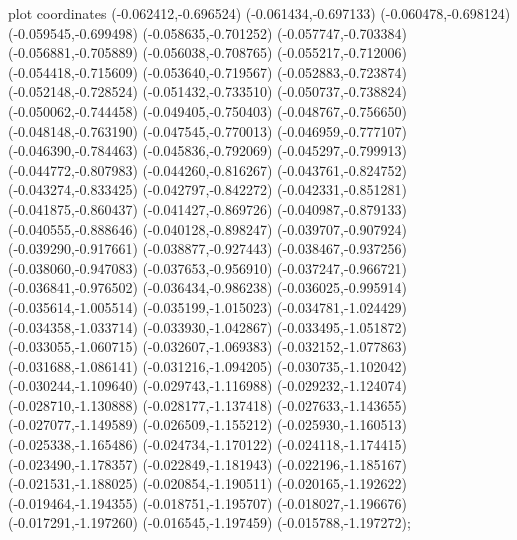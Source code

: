 { plot coordinates {(-0.062412,-0.696524) (-0.061434,-0.697133) (-0.060478,-0.698124) (-0.059545,-0.699498) (-0.058635,-0.701252) (-0.057747,-0.703384) (-0.056881,-0.705889) (-0.056038,-0.708765) (-0.055217,-0.712006) (-0.054418,-0.715609) (-0.053640,-0.719567) (-0.052883,-0.723874) (-0.052148,-0.728524) (-0.051432,-0.733510) (-0.050737,-0.738824) (-0.050062,-0.744458) (-0.049405,-0.750403) (-0.048767,-0.756650) (-0.048148,-0.763190) (-0.047545,-0.770013) (-0.046959,-0.777107) (-0.046390,-0.784463) (-0.045836,-0.792069) (-0.045297,-0.799913) (-0.044772,-0.807983) (-0.044260,-0.816267) (-0.043761,-0.824752) (-0.043274,-0.833425) (-0.042797,-0.842272) (-0.042331,-0.851281) (-0.041875,-0.860437) (-0.041427,-0.869726) (-0.040987,-0.879133) (-0.040555,-0.888646) (-0.040128,-0.898247) (-0.039707,-0.907924) (-0.039290,-0.917661) (-0.038877,-0.927443) (-0.038467,-0.937256) (-0.038060,-0.947083) (-0.037653,-0.956910) (-0.037247,-0.966721) (-0.036841,-0.976502) (-0.036434,-0.986238) (-0.036025,-0.995914) (-0.035614,-1.005514) (-0.035199,-1.015023) (-0.034781,-1.024429) (-0.034358,-1.033714) (-0.033930,-1.042867) (-0.033495,-1.051872) (-0.033055,-1.060715) (-0.032607,-1.069383) (-0.032152,-1.077863) (-0.031688,-1.086141) (-0.031216,-1.094205) (-0.030735,-1.102042) (-0.030244,-1.109640) (-0.029743,-1.116988) (-0.029232,-1.124074) (-0.028710,-1.130888) (-0.028177,-1.137418) (-0.027633,-1.143655) (-0.027077,-1.149589) (-0.026509,-1.155212) (-0.025930,-1.160513) (-0.025338,-1.165486) (-0.024734,-1.170122) (-0.024118,-1.174415) (-0.023490,-1.178357) (-0.022849,-1.181943) (-0.022196,-1.185167) (-0.021531,-1.188025) (-0.020854,-1.190511) (-0.020165,-1.192622) (-0.019464,-1.194355) (-0.018751,-1.195707) (-0.018027,-1.196676) (-0.017291,-1.197260) (-0.016545,-1.197459) (-0.015788,-1.197272)};
}
